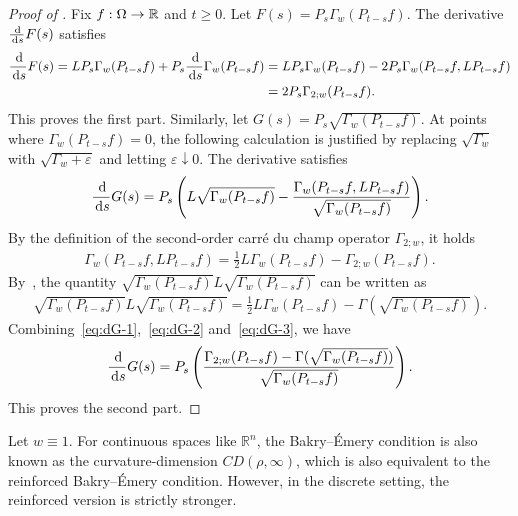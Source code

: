\begin{proof}[Proof of ]
    Fix $f : \Omega \to \mathbb{R}$ and $t \ge 0$. Let $F(s) = P_s \Gamma_w(P_{t-s} f)$. The derivative $\frac{\,\mathrm{d} }{\,\mathrm{d} s} F(s)$ satisfies
    \begin{align*}
        \frac{\,\mathrm{d} }{\,\mathrm{d} s} F(s) = L P_s \Gamma_w(P_{t-s} f) + P_s \frac{\,\mathrm{d}}{\,\mathrm{d} s} \Gamma_w(P_{t-s} f) &= L P_s \Gamma_w(P_{t-s} f) -2 P_s \Gamma_w(P_{t-s}f, LP_{t-s} f)\\
        &= 2 P_s \Gamma_{2;w}(P_{t-s} f).
    \end{align*}
    This proves the first part. Similarly, let $G(s) = P_s \sqrt{\Gamma_w(P_{t-s} f)}$. At points where $\Gamma_w(P_{t-s}f)=0$, the following calculation is justified by replacing $\sqrt{\Gamma_w}$ with $\sqrt{\Gamma_w+\varepsilon}$ and letting $\varepsilon\downarrow0$. The derivative satisfies
    \begin{align}\label{eq:dG-1}
    \frac{\,\mathrm{d}}{\,\mathrm{d} s} G(s) = P_s \left(L \sqrt{\Gamma_w(P_{t-s} f)} - \frac{\Gamma_w(P_{t-s} f, L P_{t-s} f)}{\sqrt{\Gamma_w(P_{t-s} f)}}\right).
    \end{align} 
    By the definition of the second-order carr\'e du champ operator $\Gamma_{2;w}$, it holds
    \begin{align}\label{eq:dG-2}
        \Gamma_w(P_{t-s} f, L P_{t-s} f) = \frac{1}{2} L \Gamma_w(P_{t-s} f) - \Gamma_{2;w}(P_{t-s} f). 
    \end{align}
    By~, the quantity $\sqrt{\Gamma_w(P_{t-s} f)} L\sqrt{\Gamma_w(P_{t-s} f)}$ can be written as
    \begin{align}\label{eq:dG-3}
        \sqrt{\Gamma_w(P_{t-s} f)} L\sqrt{\Gamma_w(P_{t-s} f)} = \frac{1}{2} L \Gamma_w(P_{t-s} f) - \Gamma(\sqrt{\Gamma_w(P_{t-s} f)}).
    \end{align}
    Combining~\ref{eq:dG-1},~\ref{eq:dG-2} and~\ref{eq:dG-3}, we have
    \begin{align*}
    \frac{\,\mathrm{d}}{\,\mathrm{d} s} G(s) = P_s\left(\frac{\Gamma_{2;w}(P_{t-s} f) - \Gamma(\sqrt{\Gamma_w(P_{t-s} f)})}{\sqrt{\Gamma_w(P_{t-s} f)}}\right).
    \end{align*}
    This proves the second part.
\end{proof}

\begin{remark}
    Let $w \equiv 1$.
    For continuous spaces like $\mathbb{R}^n$, the Bakry--\'Emery condition is also known as the curvature-dimension $CD(\rho,\infty)$, which is also equivalent to the reinforced Bakry--\'Emery condition. However, in the discrete setting, the reinforced version is strictly stronger. 
\end{remark}

